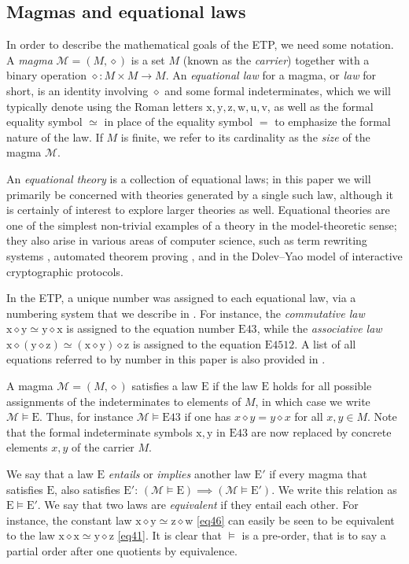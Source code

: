 \documentclass[12pt]{amsart}
\theoremstyle{definition}
\newcommand{\x}{\mathrm{x}}
\newcommand{\y}{\mathrm{y}}
\newcommand{\z}{\mathrm{z}}
\newcommand{\w}{\mathrm{w}}
\newcommand{\uu}{\mathrm{u}}
\newcommand{\vv}{\mathrm{v}}
\newcommand{\op}{\diamond}
\newcommand{\formaleq}{\simeq}
\newcommand{\Magma}{{\mathcal{M}}}
\newcommand{\Eq}[1]{\mathrm{E}#1}
\newcommand{\E}{\mathrm{E}}
\begin{document}
\subsection{Magmas and equational laws}

In order to describe the mathematical goals of the ETP, we need some notation. A \emph{magma} $\Magma = (M,\op)$ is a set $M$ (known as the \emph{carrier}) together with a binary operation $\op \colon M \times M \to M$. An \emph{equational law} for a magma, or \emph{law} for short, is an identity involving $\op$ and some formal indeterminates, which we will typically denote using the Roman letters $\x,\y,\z,\w,\uu,\vv$, as well as the formal equality symbol $\formaleq$ in place of the equality symbol $=$ to emphasize the formal nature of the law.  If $M$ is finite, we refer to its cardinality as the \emph{size} of the magma $\Magma$.

An \emph{equational theory} is a collection of equational laws; in this paper we will primarily be concerned with theories generated by a single such law, although it is certainly of interest to explore larger theories as well.  Equational theories are one of the simplest non-trivial examples of a theory in the model-theoretic sense; they also arise in various areas of computer science, such as term rewriting systems \cite{term-rewriting}, automated theorem proving \cite{mccune-survey}, and in the Dolev--Yao model \cite{dolev} of interactive cryptographic protocols.

In the ETP, a unique number was assigned to each equational law, via a numbering system that we describe in .  For instance, the \emph{commutative law} $\x \op \y \formaleq \y \op \x$ is assigned to the equation number $\Eq{43}$, while the \emph{associative law} $\x \op (\y \op \z) \formaleq (\x \op \y) \op \z$ is assigned to the equation $\Eq{4512}$.  A list of all equations referred to by number in this paper is also provided in .

A magma $\Magma = (M,\op)$ satisfies a law $\E$ if the law $\E$ holds for all possible assignments of the indeterminates to elements of $M$, in which case we write $\Magma \models \E$. Thus, for instance $\Magma \models \Eq{43}$ if one has $x \op y = y \op x$ for all $x,y \in M$.  Note that the formal indeterminate symbols $\x, \y$ in $\Eq{43}$ are now replaced by concrete elements $x,y$ of the carrier $M$.

We say that a law $\E$ \emph{entails} or \emph{implies} another law ${\E'}$ if every magma that satisfies $\E$, also satisfies ${\E'}$: $(\Magma \models \E) \implies (\Magma \models {\E'})$.  We write this relation as ${\E} \models {\E'}$. We say that two laws are \emph{equivalent} if they entail each other. For instance, the constant law $\x \op \y \formaleq \z \op \w$ \eqref{eq46} can easily be seen to be equivalent to the law $\x \op \x \formaleq \y \op \z$ \eqref{eq41}.  It is clear that $\models$ is a pre-order, that is to say a partial order after one quotients by equivalence.
\end{document}
